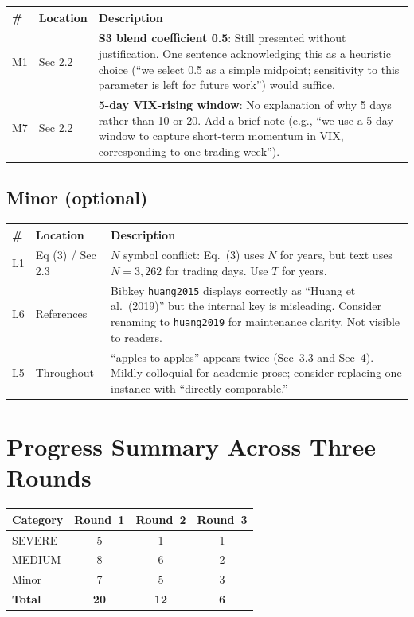 \documentclass[12pt,a4paper]{article}
\begin{document}
\begin{longtable}{p{0.6cm}p{2.5cm}p{10.5cm}}
\toprule
\# & Location & Description \\
\midrule
M1 & Sec 2.2 & \textbf{S3 blend coefficient 0.5}: Still presented without justification. One sentence acknowledging this as a heuristic choice (``we select 0.5 as a simple midpoint; sensitivity to this parameter is left for future work'') would suffice. \\
\midrule
M7 & Sec 2.2 & \textbf{5-day VIX-rising window}: No explanation of why 5 days rather than 10 or 20. Add a brief note (e.g., ``we use a 5-day window to capture short-term momentum in VIX, corresponding to one trading week''). \\
\bottomrule
\end{longtable}

\subsection*{Minor (optional)}

\begin{longtable}{p{0.6cm}p{2.5cm}p{10.5cm}}
\toprule
\# & Location & Description \\
\midrule
L1 & Eq (3) / Sec 2.3 & $N$ symbol conflict: Eq.~(3) uses $N$ for years, but text uses $N = 3{,}262$ for trading days. Use $T$ for years. \\
\midrule
L6 & References & Bibkey \texttt{huang2015} displays correctly as ``Huang et al.\ (2019)'' but the internal key is misleading. Consider renaming to \texttt{huang2019} for maintenance clarity. Not visible to readers. \\
\midrule
L5 & Throughout & ``apples-to-apples'' appears twice (Sec~3.3 and Sec~4). Mildly colloquial for academic prose; consider replacing one instance with ``directly comparable.'' \\
\bottomrule
\end{longtable}

\section*{Progress Summary Across Three Rounds}

\begin{center}
\begin{tabular}{lccc}
\toprule
Category & Round~1 & Round~2 & Round~3 \\
\midrule
SEVERE & 5 & 1 & 1 \\
MEDIUM & 8 & 6 & 2 \\
Minor & 7 & 5 & 3 \\
\midrule
\textbf{Total} & \textbf{20} & \textbf{12} & \textbf{6} \\
\bottomrule
\end{tabular}
\end{center}
\end{document}

